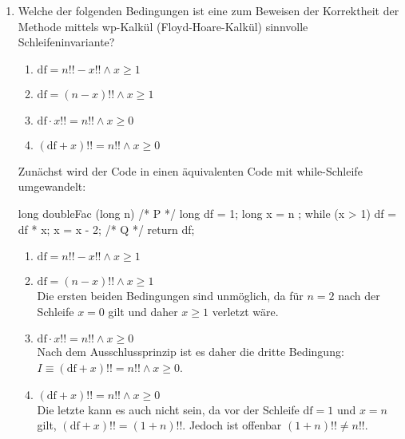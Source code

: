 \documentclass{bschlangaul-aufgabe}
\begin{document}
\begin{enumerate}


\item Welche der folgenden Bedingungen ist eine zum Beweisen der
Korrektheit der Methode mittels wp-Kalkül (Floyd-Hoare-Kalkül) sinnvolle
Schleifeninvariante?

\begin{enumerate}
\item $\text{df} = n!! - x!! \land x \geq 1$
\item $\text{df} = (n - x)!! \land x \geq 1$
\item $\text{df} \cdot x!! = n!! \land x \geq 0$
\item $(\text{df} + x)!! = n!! \land x \geq 0$
\end{enumerate}

\begin{bAntwort}
Zunächst wird der Code in einen äquivalenten Code mit while-Schleife
umgewandelt:

\begin{bJavaAngabe}
long doubleFac (long n) {
  /* P */ long df = 1;
  long x = n ;
  while (x > 1) {
    df = df * x;
    x = x - 2;
  } /* Q */
  return df;
}
\end{bJavaAngabe}

\begin{enumerate}
\item $\text{df} = n!! - x!! \land x \geq 1$
\item $\text{df} = (n - x)!! \land x \geq 1$ \\

Die ersten beiden Bedingungen sind unmöglich, da \zB für $n = 2$ nach
der Schleife $x = 0$ gilt und daher $x \geq 1$ verletzt wäre.

\item $\text{df} \cdot x!! = n!! \land x \geq 0$ \\

Nach dem Ausschlussprinzip ist es daher die dritte Bedingung: $I \equiv
(\text{df} + x)!! = n!! \land x \geq 0$.

\item $(\text{df} + x)!! = n!! \land x \geq 0$ \\

Die letzte kann es auch nicht sein, da vor der Schleife $\text{df} = 1$
und $x = n$ gilt, \dh $(\text{df} + x)!! = (1 + n)!!$. Jedoch ist
offenbar $(1 + n)!! \not = n!!$.
\end{enumerate}


\end{bAntwort}
\end{enumerate}
\end{document}
